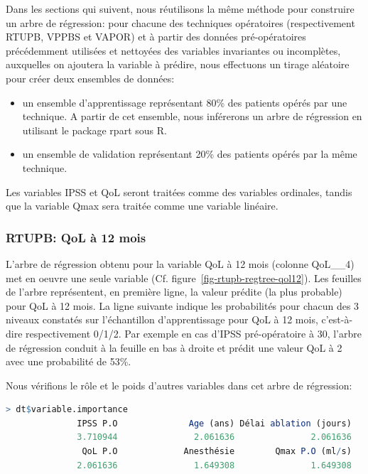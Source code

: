 %
%

%

Dans les sections qui suivent, nous réutilisons la même méthode pour construire un arbre de régression:
pour chacune des techniques opératoires (respectivement RTUPB, VPPBS et VAPOR) et à partir des données pré-opératoires précédemment utilisées et nettoyées des variables invariantes ou incomplètes, auxquelles on ajoutera
la variable à prédire, nous effectuons un tirage aléatoire pour créer deux ensembles de données:
\begin{itemize}
\item un ensemble d'apprentissage représentant 80\% des patients opérés par une technique. A partir de cet ensemble, nous inférerons un arbre de régression en utilisant le package rpart sous R.
\item un ensemble de validation représentant 20\% des patients opérés par la même technique.
\end{itemize}
Les variables IPSS et QoL seront traitées comme des variables ordinales, tandis que la variable Qmax sera
traitée comme une variable linéaire.

\subsubsection{RTUPB: QoL à 12 mois}

L'arbre de régression obtenu pour la variable QoL à 12 mois (colonne QoL\_\_4) met en oeuvre une seule variable (Cf. figure~\ref{fig-rtupb-regtree-qol12}). Les feuilles de l'arbre représentent, en première ligne, la valeur prédite (la plus probable) pour QoL à 12 mois. La ligne suivante indique les probabilités pour chacun des 3 niveaux constatés sur l'échantillon d'apprentissage pour QoL à 12 mois, c'est-à-dire respectivement 0/1/2. Par exemple en cas d'IPSS pré-opératoire à 30, l'arbre de régression conduit à la feuille en bas à droite et prédit une valeur QoL à 2 avec une probabilité de 53\%.

Nous vérifions le rôle et le poids d'autres variables dans cet arbre de régression:
\begin{lstlisting}[language=R]
> dt$variable.importance
              IPSS P.O              Age (ans) Délai ablation (jours) 
              3.710944               2.061636               2.061636 
               QoL P.O             Anesthésie        Qmax P.O (ml/s) 
              2.061636               1.649308               1.649308 
\end{lstlisting}


